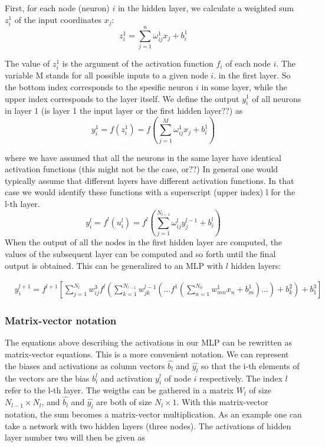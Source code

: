 \documentclass[a4paper,12pt]{article}
\begin{document}
First, for each node (neuron) $i$ in the hidden layer, we calculate a weighted sum $z_i^1$ of the input coordinates $x_j$:
\begin{equation}
    z_i^1 = \sum_{j=1}^n \omega_{ij}^1 x_j + b_i^1
\end{equation}

The value of $z_i^1$ is the argument of the activation function $f_i$ of each node $i$. The variable M stands for all possible inputs to a given node $i$. in the first layer. So the bottom index corresponds to the spesific neuron $i$ in some layer, while the upper index corresponds to the layer itself. We define the output $y_i^1$ of all neurons in layer 1 (is layer 1 the input layer or the first hidden layer??) as
\begin{equation}
    y_i^1 = f(z_i^1) = f( \sum_{j=1}^M \omega_{ij}^1 x_j + b_i^1 )
\end{equation}

where we have assumed that all the neurons in the same layer have identical activation functions (this might not be the case, or??) In general one would typically assume that different layers have different activation functions. In that case we would identify these functions with a superscript (upper index) l for the l-th layer.
\begin{equation}
    y_i^l = f^l(u_i^l) = f^l( \sum_{j=1}^{N_{l-1}} \omega_{ij}^l y_j^{l-1} + b_i^l )
\end{equation}
When the output of all the nodes in the first hidden layer are computed, the values of the subsequent layer can be computed and so forth until the final output is obtained.\newline
This can be generalized to an MLP with $l$ hidden layers:

\begin{align}
&y^{l+1}_i = f^{l+1}\left[\!\sum_{j=1}^{N_l} w_{ij}^3 f^l\left(\sum_{k=1}^{N_{l-1}}w_{jk}^{l-1}\left(\dots f^1\left(\sum_{n=1}^{N_0} w_{mn}^1 x_n+ b_m^1\right)\dots\right)+b_k^2\right)+b_1^3\right]
\end{align}


\subsubsection{Matrix-vector notation}
The equations above describing the activations in our MLP can be rewritten as matrix-vector equations. This is a more convenient notation.\newline
We can represent the biases and activations as column vectors $\hat{b_l}$ and $\hat{y_l}$ so that the i-th elements of the vectors are the bias $b_i^l$ and activation $y_i^l$ of node $i$ respectively. The index $l$ refer to the l-th layer.\newline
The weigths can be gathered in a matrix $W_l$ of size $N_{l-1} \times N_l$, and $\hat{b_l}$ and $\hat{y_l}$ are both of size $N_l \times 1$. With this matrix-vector notation, the sum becomes a matrix-vector multiplication. As an example one can take a network with two hidden layers (three nodes). The activations of hidden layer number two will then be given as
\end{document}
